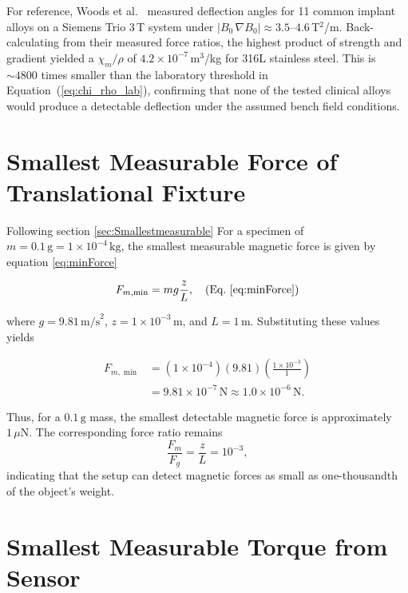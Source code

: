 For reference, Woods et al.\ \cite{Woods2021_MRIdisplacement} measured deflection angles for 11 common implant alloys on a Siemens Trio 3\,T system under $|B_0\,\nabla B_0| \approx 3.5$--$4.6$\,T$^2$/m. Back-calculating from their measured force ratios, the highest product of strength and gradient yielded a $\chi_m/\rho$ of $4.2\times10^{-7}$\,m$^3$/kg for 316L stainless steel. This is $\sim\!4800$ times smaller than the laboratory threshold in Equation~(\ref{eq:chi_rho_lab}), confirming that none of the tested clinical alloys would produce a detectable deflection under the assumed bench field conditions.

\section{Smallest Measurable Force of Translational Fixture}
\label{app:smallestForce}

Following section \ref{sec:Smallestmeasurable} For a specimen of $m = 0.1\,\text{g} = 1\times10^{-4}\,\text{kg}$, the smallest measurable magnetic force is given by equation \ref{eq:minForce}

\begin{equation}
	F_{m,\min} = m g \frac{z}{L}, \quad	\text{(Eq.~\ref{eq:minForce})} \nonumber 
\end{equation}

\noindent where $g = 9.81\,\text{m/s}^2$, $z = 1\times10^{-3}\,\text{m}$, and $L = 1\,\text{m}$. Substituting these values yields

\begin{align}
	F_{m,\min} &= (1\times10^{-4})(9.81)\left(\frac{1\times10^{-3}}{1}\right) \nonumber\\
	&= 9.81\times10^{-7}\,\text{N} \approx 1.0\times10^{-6}\,\text{N}.
\end{align}

\noindent Thus, for a $0.1\,\text{g}$ mass, the smallest detectable magnetic force is approximately $1\,\mu\text{N}$. The corresponding force ratio remains 
\begin{equation}
	\frac{F_m}{F_g} = \frac{z}{L} = 10^{-3},
\end{equation}
\noindent indicating that the setup can detect magnetic forces as small as one-thousandth of the object’s weight.

\section{Smallest Measurable Torque from Sensor}
\label{app:smallestTorque}

